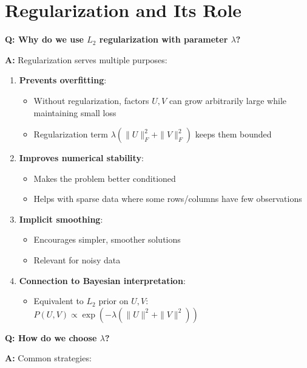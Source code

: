 \documentclass[11pt,oneside]{article}
\newcommand{\question}[1]{\textbf{Q: #1}}
\newcommand{\answer}{\textbf{A: }}
\begin{document}
\section{Regularization and Its Role}\label{sec:regularization}

\question{Why do we use $L_2$ regularization with parameter $\lambda$?}

\answer Regularization serves multiple purposes:

\begin{enumerate}
    \item \textbf{Prevents overfitting}: 
    \begin{itemize}
        \item Without regularization, factors $U, V$ can grow arbitrarily large while maintaining small loss
        \item Regularization term $\lambda(\|U\|_F^2 + \|V\|_F^2)$ keeps them bounded
    \end{itemize}
    
    \item \textbf{Improves numerical stability}:
    \begin{itemize}
        \item Makes the problem better conditioned
        \item Helps with sparse data where some rows/columns have few observations
    \end{itemize}
    
    \item \textbf{Implicit smoothing}:
    \begin{itemize}
        \item Encourages simpler, smoother solutions
        \item Relevant for noisy data
    \end{itemize}
    
    \item \textbf{Connection to Bayesian interpretation}:
    \begin{itemize}
        \item Equivalent to $L_2$ prior on $U, V$: $P(U,V) \propto \exp(-\lambda(\|U\|^2 + \|V\|^2))$
    \end{itemize}
\end{enumerate}

\medskip

\question{How do we choose $\lambda$?}

\answer Common strategies:
\end{document}
